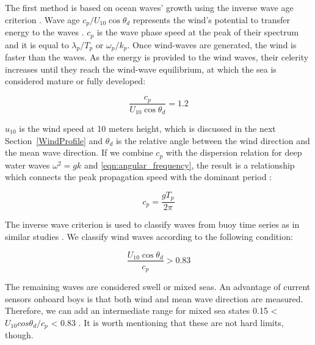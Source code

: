 The first method is based on ocean waves' growth using the inverse wave age criterion \cite{Hanley2010}. Wave age $c_{p}/U_{10}\cos{\theta_{d}}$ represents the wind's potential to transfer energy to the waves \cite{Zhao2019}. $c_{p}$ is the wave phase speed at the peak of their spectrum and it is equal to $\lambda_{p}/T_{p}$ or $\omega_{p}/k_{p}$. Once wind-waves are generated, the wind is faster than the waves. As the energy is provided to the wind waves, their celerity increases until they reach the wind-wave equilibrium, at which the sea is considered mature or fully developed:


\begin{equation}
\frac{c_{p}}{U_{10}\cos{\theta_{d}}} = 1.2
\label{eqn:wave_age}
\end{equation}

$u_{10}$ is the wind speed at 10 meters height, which is discussed in the next Section~\ref{WindProfile} and $\theta_{d}$ is the relative angle between the wind direction and the mean wave direction. 
If we combine $c_{p}$ with the dispersion relation for deep water waves $\omega^{2} = gk$ and \ref{eqn:angular_frequency}, the result is a relationship which connects the peak propagation speed with the dominant period \cite{Hanley2010}:

\begin{equation}
c_{p} = \frac{gT_{p}}{2\pi}
\label{eqn:peak_wave_speed}
\end{equation}


The inverse wave criterion is used to classify waves from buoy time series as in similar studies \cite{DeFarias2012a, Hanley2010}. We classify wind waves according to the following condition:

\begin{equation}
\frac{U_{10}\cos{\theta_{d}}}{c_{p}} > 0.83
\label{eqn:inv_wave_age}
\end{equation}

The remaining waves are considered swell or mixed seas. An advantage of current sensors onboard boys is that both wind and mean wave direction are measured. Therefore, we can add an intermediate range for mixed sea states 0.15 < $U_{10}cos{\theta_{d}}/c_{p}$ < 0.83 \cite{Hanley2010}. It is worth mentioning that these are not hard limits, though. 

\vspace{4mm} 

